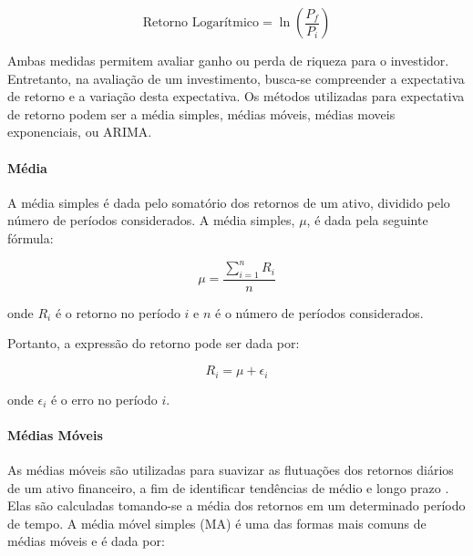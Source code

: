            \begin{equation}
                \text{Retorno Logarítmico} = \ln \left( {\frac{{P_f}}{{P_i}}} \right)
            \end{equation}
            
            \ipar Ambas medidas permitem avaliar ganho ou perda de riqueza para o investidor. Entretanto, na avaliação de um investimento, busca-se compreender a expectativa de retorno e a variação desta expectativa. Os métodos utilizadas para expectativa de retorno podem ser a média simples, médias móveis, médias moveis exponenciais, ou \acrshort{ARIMA}.

            \paragraph{Média}

                \ipar A média simples é dada pelo somatório dos retornos de um ativo, dividido pelo número de períodos considerados\cite{yu2020neural}. A média simples, $\mu$, é dada pela seguinte fórmula:

                \begin{equation}
                    \mu = \frac{{\sum_{i=1}^{n} R_i}}{{n}}
                \end{equation}

                \noindent onde $R_i$ é o retorno no período $i$ e $n$ é o número de períodos considerados.

                \ipar Portanto, a expressão do retorno pode ser dada por:

                \begin{equation}
                    R_{i} = \mu + \epsilon_{i}
                \end{equation}

                onde $\epsilon_{i}$ é o erro no período $i$.

            \paragraph{Médias Móveis}

                \ipar As médias móveis são utilizadas para suavizar as flutuações dos retornos diários de um ativo financeiro, a fim de identificar tendências de médio e longo prazo \cite{vukovic2020neural}. Elas são calculadas tomando-se a média dos retornos em um determinado período de tempo. A média móvel simples (\acrshort{MA}) é uma das formas mais comuns de médias móveis e é dada por:

